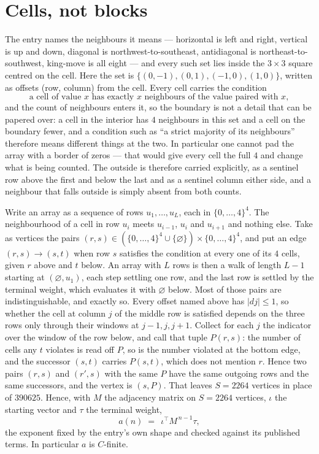 \documentclass[11pt,a4paper]{article}
\theoremstyle{plain}
\theoremstyle{definition}
\begin{document}
\section{Cells, not blocks}

The entry names the neighbours it means --- horizontal is left and right, vertical is up and
down, diagonal is northwest-to-southeast, antidiagonal is northeast-to-southwest, king-move is
all eight --- and every such set lies inside the $3\times3$ square centred on the cell. Here
the set is $\{(0,-1), (0,1), (-1,0), (1,0)\}$, written as offsets (row, column) from the cell. Every cell carries
the condition
\[
\text{a cell of value }x\text{ has exactly }x\text{ neighbours of the value paired with }x,
\]
and the count of neighbours enters it, so the boundary is not a detail that can be papered
over: a cell in the interior has $4$ neighbours in this set and a cell on the boundary
fewer, and a condition such as ``a strict majority of its neighbours'' therefore means
different things at the two. In particular one cannot pad the array with a border of zeros ---
that would give every cell the full $4$ and change what is being counted. The outside is
therefore carried
explicitly, as a sentinel row above the first and below the last and as a sentinel column
either side, and a neighbour that falls outside is simply absent from both counts.

Write an array as a sequence of rows $u_1,\dots,u_L$, each in
$\{0,\dots,4\}^{4}$. The neighbourhood of a cell in row $u_i$ meets $u_{i-1}$,
$u_i$ and $u_{i+1}$ and nothing else. Take as vertices the pairs
$(r,s)\in(\{0,\dots,4\}^{4}\cup\{\varnothing\})\times\{0,\dots,4\}^{4}$,
and put an edge $(r,s)\to(s,t)$ when row $s$ satisfies the condition at every one of its
$4$ cells, given $r$ above and $t$ below. An array with $L$ rows is then a walk of length
$L-1$ starting at $(\varnothing,u_1)$, each step settling one row, and the last row is
settled by the terminal weight, which evaluates it with $\varnothing$ below. Most of those pairs are indistinguishable, and exactly so. Every offset named above has $|dj|\le 1$, so whether the cell at column $j$ of the middle row is satisfied depends on the three rows only through their windows at $j-1,j,j+1$. Collect for each $j$ the indicator over the window of the row below, and call that tuple $P(r,s)$: the number of cells any $t$ violates is read off $P$, so is the number violated at the bottom edge, and the successor $(s,t)$ carries $P(s,t)$, which does not mention $r$. Hence two pairs $(r,s)$ and $(r',s)$ with the same $P$ have the same outgoing rows and the same successors, and the vertex is $(s,P)$. That leaves $S=2264$ vertices in place of $390625$. Hence,
with $M$ the adjacency matrix on $S=2264$ vertices, $\iota$ the starting vector and $\tau$ the
terminal weight,
\[
a(n)\;=\;\,\iota^{\!\top}M^{\,n-1}\tau ,
\]
the exponent fixed by the entry's own shape and checked against its published terms. In
particular $a$ is $C$-finite.
\end{document}
